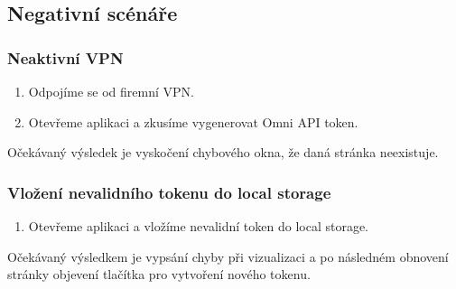 \documentclass[czech, bc, kiv, he, iso690numb, viewonly]{fasthesis} %
\begin{document}
\subsection{Negativní scénáře}

\subsubsection{Neaktivní VPN}
\begin{enumerate}
	\item Odpojíme se od firemní VPN.
	\item Otevřeme aplikaci a zkusíme vygenerovat Omni API token.
\end{enumerate}
Očekávaný výsledek je vyskočení chybového okna, že daná stránka neexistuje.

\subsubsection{Vložení nevalidního tokenu do local storage}
\begin{enumerate}
	\item Otevřeme aplikaci a vložíme nevalidní token do local storage.
\end{enumerate}
Očekávaný výsledkem je vypsání chyby při vizualizaci a po následném obnovení stránky objevení tlačítka pro vytvoření nového tokenu.



\backmatter
\printbibliography
\listoffigures
\listoftables
\listoflistings

%
%
\setbackpageqrcode
\backpage
\end{document}
